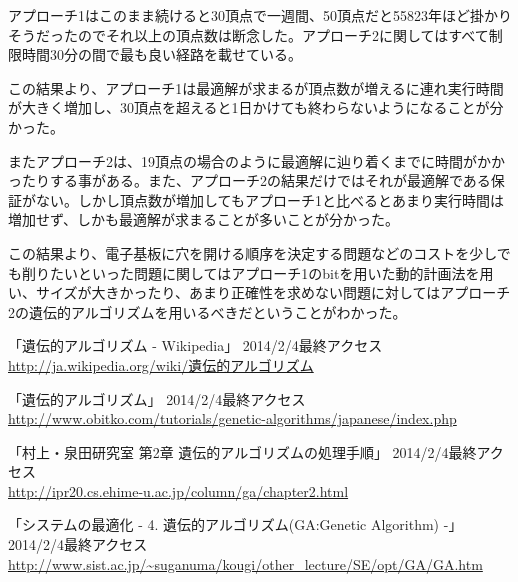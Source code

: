 \documentclass[a4paper, 11pt]{jsarticle}
\begin{document}
	アプローチ1はこのまま続けると30頂点で一週間、50頂点だと55823年ほど掛かりそうだったのでそれ以上の頂点数は断念した。アプローチ2に関してはすべて制限時間30分の間で最も良い経路を載せている。\newline

	この結果より、アプローチ1は最適解が求まるが頂点数が増えるに連れ実行時間が大きく増加し、30頂点を超えると1日かけても終わらないようになることが分かった。

	またアプローチ2は、19頂点の場合のように最適解に辿り着くまでに時間がかかったりする事がある。また、アプローチ2の結果だけではそれが最適解である保証がない。しかし頂点数が増加してもアプローチ1と比べるとあまり実行時間は増加せず、しかも最適解が求まることが多いことが分かった。

	この結果より、電子基板に穴を開ける順序を決定する問題などのコストを少しでも削りたいといった問題に関してはアプローチ1のbitを用いた動的計画法を用い、サイズが大きかったり、あまり正確性を求めない問題に対してはアプローチ2の遺伝的アルゴリズムを用いるべきだということがわかった。


	\begin{thebibliography}{4}
		\item 「遺伝的アルゴリズム - Wikipedia」 2014/2/4最終アクセス \\
			\url{http://ja.wikipedia.org/wiki/遺伝的アルゴリズム}
		\item 「遺伝的アルゴリズム」 2014/2/4最終アクセス \\
			\url{http://www.obitko.com/tutorials/genetic-algorithms/japanese/index.php}
		\item 「村上・泉田研究室 第2章 遺伝的アルゴリズムの処理手順」 2014/2/4最終アクセス \\
			\url{http://ipr20.cs.ehime-u.ac.jp/column/ga/chapter2.html}
		\item 「システムの最適化 - 4. 遺伝的アルゴリズム(GA:Genetic Algorithm) -」 2014/2/4最終アクセス \\
			\url{http://www.sist.ac.jp/~suganuma/kougi/other_lecture/SE/opt/GA/GA.htm}
	\end{thebibliography}
\end{document}

